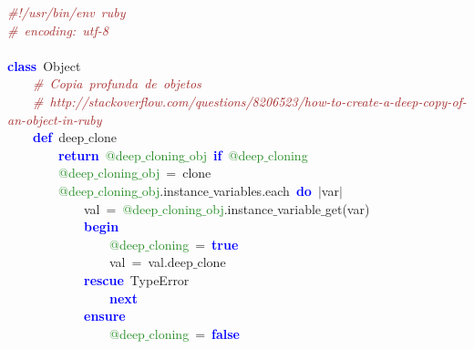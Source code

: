 \noindent
\mbox{}\textit{\textcolor{Brown}{\#!/usr/bin/env\ ruby}} \\
\mbox{}\textit{\textcolor{Brown}{\#\ encoding:\ utf-8}} \\
\mbox{} \\
\mbox{}\textbf{\textcolor{Blue}{class}}\ Object \\
\mbox{}\ \ \ \ \textit{\textcolor{Brown}{\#\ Copia\ profunda\ de\ objetos}} \\
\mbox{}\ \ \ \ \textit{\textcolor{Brown}{\#\ http://stackoverflow.com/questions/8206523/how-to-create-a-deep-copy-of-an-object-in-ruby}} \\
\mbox{}\ \ \ \ \textbf{\textcolor{Blue}{def}}\ deep$\_$clone \\
\mbox{}\ \ \ \ \ \ \ \ \textbf{\textcolor{Blue}{return}}\ \textcolor{ForestGreen}{@deep$\_$cloning$\_$obj}\ \textbf{\textcolor{Blue}{if}}\ \textcolor{ForestGreen}{@deep$\_$cloning} \\
\mbox{}\ \ \ \ \ \ \ \ \textcolor{ForestGreen}{@deep$\_$cloning$\_$obj}\ \textcolor{BrickRed}{=}\ clone \\
\mbox{}\ \ \ \ \ \ \ \ \textcolor{ForestGreen}{@deep$\_$cloning$\_$obj}\textcolor{BrickRed}{.}instance$\_$variables\textcolor{BrickRed}{.}each\ \textbf{\textcolor{Blue}{do}}\ \textcolor{BrickRed}{$|$}var\textcolor{BrickRed}{$|$} \\
\mbox{}\ \ \ \ \ \ \ \ \ \ \ \ val\ \textcolor{BrickRed}{=}\ \textcolor{ForestGreen}{@deep$\_$cloning$\_$obj}\textcolor{BrickRed}{.}instance$\_$variable$\_$get\textcolor{BrickRed}{(}var\textcolor{BrickRed}{)} \\
\mbox{}\ \ \ \ \ \ \ \ \ \ \ \ \textbf{\textcolor{Blue}{begin}} \\
\mbox{}\ \ \ \ \ \ \ \ \ \ \ \ \ \ \ \ \textcolor{ForestGreen}{@deep$\_$cloning}\ \textcolor{BrickRed}{=}\ \textbf{\textcolor{Blue}{true}} \\
\mbox{}\ \ \ \ \ \ \ \ \ \ \ \ \ \ \ \ val\ \textcolor{BrickRed}{=}\ val\textcolor{BrickRed}{.}deep$\_$clone \\
\mbox{}\ \ \ \ \ \ \ \ \ \ \ \ \textbf{\textcolor{Blue}{rescue}}\ TypeError \\
\mbox{}\ \ \ \ \ \ \ \ \ \ \ \ \ \ \ \ \textbf{\textcolor{Blue}{next}} \\
\mbox{}\ \ \ \ \ \ \ \ \ \ \ \ \textbf{\textcolor{Blue}{ensure}} \\
\mbox{}\ \ \ \ \ \ \ \ \ \ \ \ \ \ \ \ \textcolor{ForestGreen}{@deep$\_$cloning}\ \textcolor{BrickRed}{=}\ \textbf{\textcolor{Blue}{false}} \\
